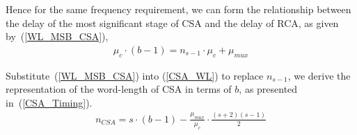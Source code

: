 \documentclass[journal]{IEEEtran}
\begin{document}
Hence for the same frequency requirement, we can form the relationship between the delay of the most significant stage of CSA and the delay of RCA, as given by~(\ref{WL_MSB_CSA}),
\begin{eqnarray}\label{WL_MSB_CSA}
    \mu_c\cdot (b-1) = n_{s-1}\cdot\mu_c+\mu_{mux}
\end{eqnarray}


Substitute~(\ref{WL_MSB_CSA}) into (\ref{CSA_WL}) to replace $n_{s-1}$, we derive the representation of the word-length of CSA in terms of $b$, as presented in~(\ref{CSA_Timing}).
\begin{eqnarray}\label{CSA_Timing}
  n_{CSA}=s\cdot (b-1)-\frac{\mu_{mux}}{\mu_{c}}\cdot\frac{(s+2)(s-1)}{2}
\end{eqnarray}




%
\end{document}
